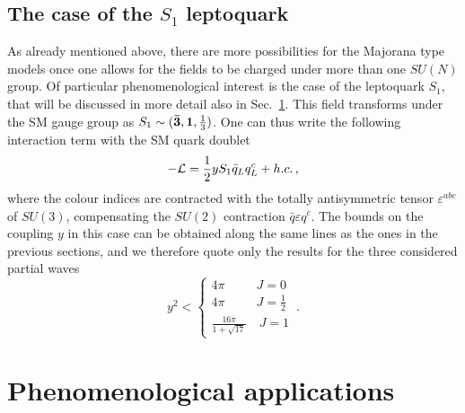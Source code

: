 \documentclass[a4paper,11pt]{article}
\newcommand{\be}{\begin{equation}}
\newcommand{\ee}{\end{equation}}
\begin{document}
\subsection{The case of the $S_1$ leptoquark}\label{sec:qq}

As already mentioned above, there are more possibilities for the Majorana type models once one allows for the fields to be charged under more than one $SU(N)$  group. Of particular phenomenological interest is the case of the leptoquark $S_1$, that will be discussed in more detail also in Sec.~\ref{sec:pheno}. This field transforms under the SM gauge group as $S_1 \sim ({\bf \bar 3}, {\bf 1}, \frac{1}{3})$.
One can thus write the following interaction term with the SM quark doublet
\be
	-{\cal L} = \frac{1}{2} y S_1 {\bar q}_L q^c_L + h.c. \,,
\ee
where the colour indices are contracted with the totally antisymmetric tensor $\varepsilon^{abc}$ of $SU(3)$, compensating the $SU(2)$ contraction $\bar q \varepsilon q^c$.
The bounds on the coupling $y$ in this case can be obtained along the same lines as the ones in the previous sections, and we therefore quote only the results for the three considered partial waves
\be
y^2 < 
\begin{cases}
4\pi \,\,\,\quad\quad J=0 \\
4\pi \,\,\,\quad\quad J=\frac{1}{2} \\
\frac{16\pi}{1 + \sqrt{17}} \quad J = 1
\end{cases} \,.
\ee








\section{Phenomenological applications}\label{sec:pheno}
\end{document}
